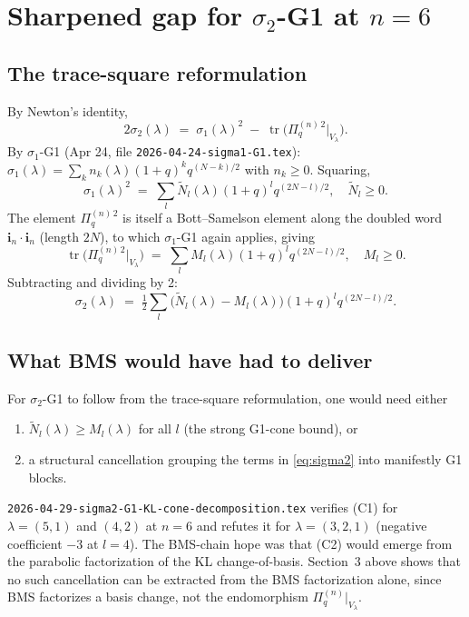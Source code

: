 \documentclass{article}
\theoremstyle{definition}
\begin{document}
\section{Sharpened gap for $\sigma_2$-G1 at $n=6$}

\subsection{The trace-square reformulation}

By Newton's identity,
\begin{equation}\label{eq:newton}
2 \sigma_2(\lambda) \;=\; \sigma_1(\lambda)^2 \;-\; \operatorname{tr}\bigl(\Pi_q^{(n)\, 2}|_{V_\lambda}\bigr).
\end{equation}
By $\sigma_1$-G1 (Apr 24, file \texttt{2026-04-24-sigma1-G1.tex}):
$\sigma_1(\lambda) = \sum_{k} n_k(\lambda)(1+q)^k q^{(N-k)/2}$ with
$n_k \geq 0$. Squaring,
\begin{equation}\label{eq:sigma1sq}
\sigma_1(\lambda)^2 \;=\; \sum_{l} \widetilde N_l(\lambda)(1+q)^l q^{(2N - l)/2},
\quad \widetilde N_l \geq 0.
\end{equation}
The element $\Pi_q^{(n)\, 2}$ is itself a Bott--Samelson element along
the doubled word $\mathbf{i}_n \cdot \mathbf{i}_n$ (length $2N$), to
which $\sigma_1$-G1 again applies, giving
\begin{equation}\label{eq:trsq}
\operatorname{tr}\bigl(\Pi_q^{(n)\, 2}|_{V_\lambda}\bigr)
\;=\; \sum_{l} M_l(\lambda)(1+q)^l q^{(2N-l)/2},
\quad M_l \geq 0.
\end{equation}
Subtracting and dividing by 2:
\begin{equation}\label{eq:sigma2}
\sigma_2(\lambda) \;=\; \tfrac{1}{2} \sum_{l} \bigl(\widetilde N_l(\lambda) - M_l(\lambda)\bigr)
(1+q)^l q^{(2N-l)/2}.
\end{equation}

\subsection{What BMS would have had to deliver}

For $\sigma_2$-G1 to follow from the trace-square reformulation, one
would need either
\begin{enumerate}
\item[(C1)] $\widetilde N_l(\lambda) \geq M_l(\lambda)$ for all $l$
(the strong G1-cone bound), or
\item[(C2)] a structural cancellation grouping the terms in
\eqref{eq:sigma2} into manifestly G1 blocks.
\end{enumerate}
\texttt{2026-04-29-sigma2-G1-KL-cone-decomposition.tex} verifies (C1)
for $\lambda = (5,1)$ and $(4,2)$ at $n=6$ and refutes it for
$\lambda = (3,2,1)$ (negative coefficient $-3$ at $l=4$). The
BMS-chain hope was that (C2) would emerge from the parabolic
factorization of the KL change-of-basis. Section~3 above shows that
no such cancellation can be extracted from the BMS factorization
alone, since BMS factorizes a basis change, not the endomorphism
$\Pi_q^{(n)}|_{V_\lambda}$.
\end{document}
